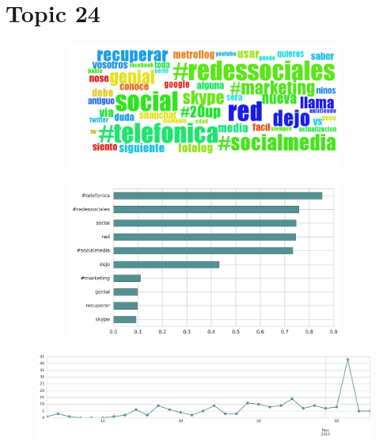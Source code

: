 \begin{longtable}{p{12.5cm}rr}
\end{longtable}
\clearpage

\section{Topic 24}

\begin{figure}[htbp!]
    \centering
    \begin{subfigure}[b]{0.49\textwidth}
        \includegraphics[width=\textwidth]{twitter_all/report_images/topic-24-wordcloud.jpg}
    \end{subfigure}
    \begin{subfigure}[b]{0.49\textwidth}
        \includegraphics[width=\textwidth]{twitter_all/report_images/topic-24-terms.jpg}
    \end{subfigure}
\end{figure}

\begin{figure}[htbp!]
    \centering
    \includegraphics[width=\textwidth]{twitter_all/report_images/topic-24-timeseries.jpg}
\end{figure}

